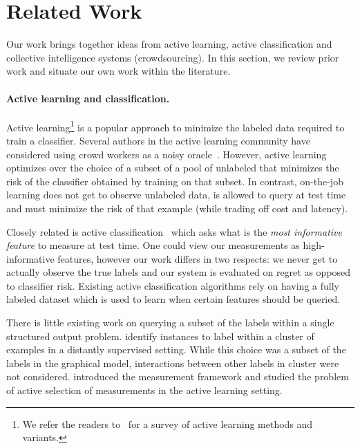 \section{Related Work}
\label{sec:related}

Our work brings together ideas from active learning, active classification and collective intelligence systems (crowdsourcing).
In this section, we review prior work and situate our own work within the literature.

\paragraph{Active learning and classification.}
Active learning\footnote{We refer the readers to~\citet{settles2010active} for a survey of active learning methods and variants.} is a popular approach to minimize the labeled data required to train a classifier. 
Several authors in the active learning community have considered using crowd workers as a noisy oracle~\citep{yan2011active,vijayanarasimhan2014large}.
However, active learning optimizes over the choice of a subset of a pool of unlabeled that minimizes the risk of the classifier obtained by training on that subset. 
In contrast, on-the-job learning does not get to observe unlabeled data, is allowed to query at test time and must minimize the risk of that example (while trading off cost and latency).

Closely related is active classification~\citep{greiner2002learning,chai2004test,esmeir2007anytime} which asks what is the {\em most informative feature\/} to measure at test time.
One could view our measurements as high-informative features, however our work differs in two respects: we never get to actually observe the true labels and our system is evaluated on regret as opposed to classifier risk.
Existing active classification algorithms rely on having a fully labeled dataset which is used to learn when certain features should be queried.

There is little existing work on querying a subset of the labels within a single structured output problem.
\citet{angeli2014combining} identify instances to label within a cluster of examples in a distantly supervised setting. While this choice was a subset of the labels in the graphical model, interactions between other labels in cluster were not considered.
\citet{liang09measurements} introduced the measurement framework and studied the problem of active selection of measurements in the active learning setting. 

